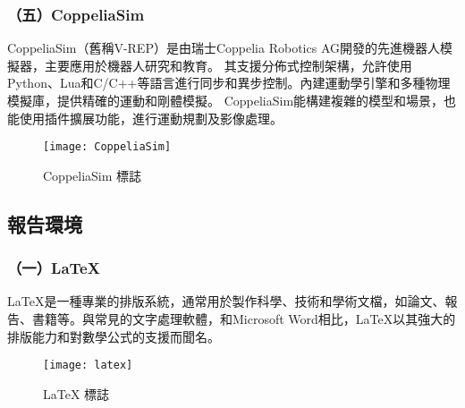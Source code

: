 \subsubsection{（五）CoppeliaSim}
CoppeliaSim（舊稱V-REP）是由瑞士Coppelia Robotics AG開發的先進機器人模擬器，主要應用於機器人研究和教育。
其支援分佈式控制架構，允許使用Python、Lua和C/C++等語言進行同步和異步控制。內建運動學引擎和多種物理模擬庫，提供精確的運動和剛體模擬。
CoppeliaSim能構建複雜的模型和場景，也能使用插件擴展功能，進行運動規劃及影像處理。\\

\begin{figure}[hbt!]
\center
\texttt{[image: CoppeliaSim]}
\caption{\Large CoppeliaSim 標誌}
\end{figure}



\subsection{報告環境}

\subsubsection{（一）LaTeX}

LaTeX是一種專業的排版系統，通常用於製作科學、技術和學術文檔，如論文、報告、書籍等。與常見的文字處理軟體，和Microsoft Word相比，LaTeX以其強大的排版能力和對數學公式的支援而聞名。
\begin{figure}[hbt!]
\center
\texttt{[image: latex]}
\caption{\Large LaTeX 標誌}
\end{figure}
\newpage

\renewcommand{\baselinestretch}{0.5} %